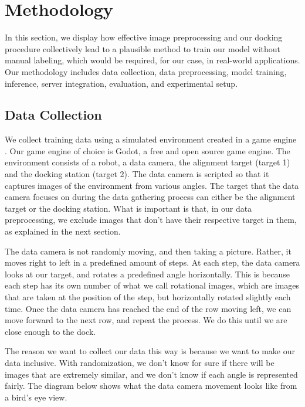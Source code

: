 \section{Methodology}
In this section, we display how effective image preprocessing and our docking procedure collectively lead to a plausible method to train our model without manual labeling, which would be required, for our case, in real-world applications. Our methodology includes data collection, data preprocessing, model training, inference, server integration, evaluation, and experimental setup.

\subsection{Data Collection}
We collect training data using a simulated environment created in a game engine \citep{hoster2024usinggameenginesmachine}. Our game engine of choice is Godot, a free and open source game engine. The environment consists of a robot, a data camera, the alignment target (target 1) and the docking station (target 2). The data camera is scripted so that it captures images of the environment from various angles. The target that the data camera focuses on during the data gathering process can either be the alignment target or the docking station. What is important is that, in our data preprocessing, we exclude images that don't have their respective target in them, as explained in the next section.

The data camera is not randomly moving, and then taking a picture. Rather, it moves right to left in a predefined amount of steps. At each step, the data camera looks at our target, and rotates a predefined angle horizontally. This is because each step has its own number of what we call rotational images, which are images that are taken at the position of the step, but horizontally rotated slightly each time. Once the data camera has reached the end of the row moving left, we can move forward to the next row, and repeat the process. We do this until we are close enough to the dock.


The reason we want to collect our data this way is because we want to make our data inclusive. With randomization, we don't know for sure if there will be images that are extremely similar, and we don't know if each angle is represented fairly. The diagram below shows what the data camera movement looks like from a bird's eye view.

